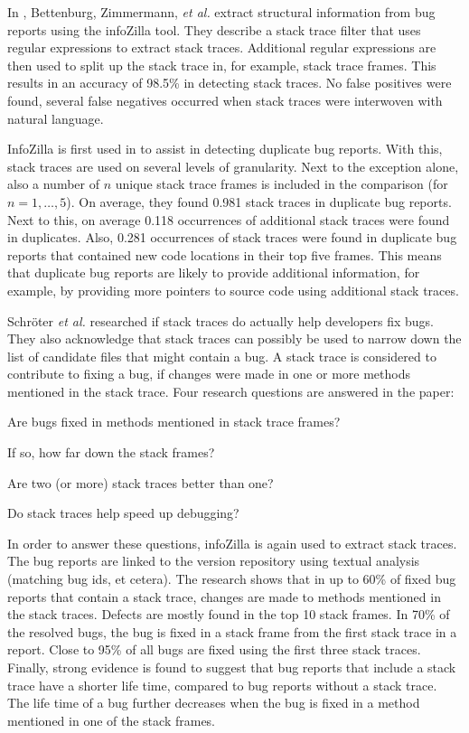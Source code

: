 In \cite{Bettenburg2008}, Bettenburg, Zimmermann, \emph{et al.} extract structural information from bug reports using the infoZilla tool. They describe a stack trace filter that uses regular expressions to extract stack traces. Additional regular expressions are then used to split up the stack trace in, for example, stack trace frames. This results in an accuracy of 98.5\% in detecting stack traces. No false positives were found, several false negatives occurred when stack traces were interwoven with natural language.

InfoZilla is first used in \cite{Bettenburg2008a} to assist in detecting duplicate bug reports. With this, stack traces are used on several levels of granularity. Next to the exception alone, also a number of $n$ unique stack trace frames is included in the comparison (for $n = 1,\dots,5$). On average, they found 0.981 stack traces in duplicate bug reports. Next to this, on average 0.118 occurrences of additional stack traces were found in duplicates. Also, 0.281 occurrences of stack traces were found in duplicate bug reports that contained new code locations in their top five frames. This means that duplicate bug reports are likely to provide additional information, for example, by providing more pointers to source code using additional stack traces.

Schr\"{o}ter \emph{et al.} \cite{Schroter2010} researched if stack traces do actually help developers fix bugs. They also acknowledge that stack traces can possibly be used to narrow down the list of candidate files that might contain a bug. A stack trace is considered to contribute to fixing a bug, if changes were made in one or more methods mentioned in the stack trace. Four research questions are answered in the paper:

\begin{enumerate*}
	\item Are bugs fixed in methods mentioned in stack trace frames?
	\item If so, how far down the stack frames?
	\item Are two (or more) stack traces better than one?
	\item Do stack traces help speed up debugging?
\end{enumerate*}

In order to answer these questions, infoZilla is again used to extract stack traces. The bug reports are linked to the version repository using textual analysis (matching bug ids, et cetera). The research shows that in up to 60\% of fixed bug reports that contain a stack trace, changes are made to methods mentioned in the stack traces. Defects are mostly found in the top 10 stack frames. In 70\% of the resolved bugs, the bug is fixed in a stack frame from the first stack trace in a report. Close to 95\% of all bugs are fixed using the first three stack traces. Finally, strong evidence is found to suggest that bug reports that include a stack trace have a shorter life time, compared to bug reports without a stack trace. The life time of a bug further decreases when the bug is fixed in a method mentioned in one of the stack frames.

